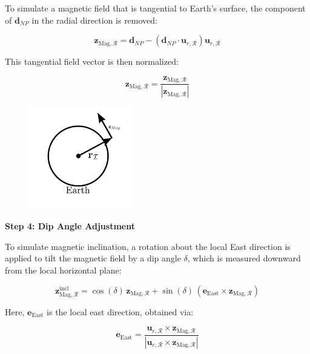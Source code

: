 To simulate a magnetic field that is tangential to Earth's surface, the component of $\mathbf{d}_{NP}$ in the radial direction is removed:

\begin{equation}
    \mathbf{z}_{\text{Mag},\mathcal{R}} = \mathbf{d}_{NP} - (\mathbf{d}_{NP} \cdot \mathbf{u}_{r,\mathcal{R}})\mathbf{u}_{r,\mathcal{R}}
\end{equation}

This tangential field vector is then normalized:

\begin{equation}
    \mathbf{z}_{\text{Mag},\mathcal{R}} = \frac{\mathbf{z}_{\text{Mag},\mathcal{R}}}{|\mathbf{z}_{\text{Mag},\mathcal{R}}|}
\end{equation}

\begin{figure}[H]
    \centering
    \includegraphics[width=0.4\textwidth]{figures/modelling/Magnetometer.pdf}
    \caption{}
    \label{fig:CSS}
\end{figure}

\textbf{Step 4: Dip Angle Adjustment}

To simulate magnetic inclination, a rotation about the local East direction is applied to tilt the magnetic field by a dip angle $\delta$, which is measured downward from the local horizontal plane:

\begin{equation}
    \mathbf{z}_{\text{Mag},\mathcal{R}}^{\text{incl}} = \cos(\delta)\,\mathbf{z}_{\text{Mag},\mathcal{R}} + \sin(\delta)\,(\mathbf{e}_{\text{East}} \times \mathbf{z}_{\text{Mag},\mathcal{R}})
\end{equation}

Here, $\mathbf{e}_{\text{East}}$ is the local east direction, obtained via:

\begin{equation}
    \mathbf{e}_{\text{East}} = \frac{\mathbf{u}_{r,\mathcal{R}} \times \mathbf{z}_{\text{Mag},\mathcal{R}}}{|\mathbf{u}_{r,\mathcal{R}} \times \mathbf{z}_{\text{Mag},\mathcal{R}}|}
\end{equation}


